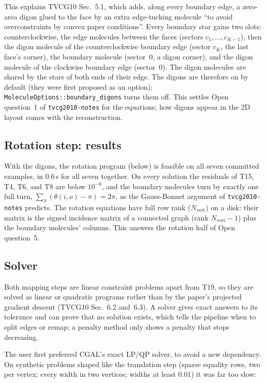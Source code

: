 \documentclass[11pt]{article}
\theoremstyle{definition}
\begin{document}
This explains TVCG10 Sec.~5.1, which adds, along every boundary edge, a
zero-area digon glued to the face by an extra edge-tucking molecule ``to avoid
overconstraints by convex paper conditions''. Every boundary star gains two
slots: counterclockwise, the edge molecules between the faces (sectors
$c_1, \dots, c_{K-1}$), then the digon molecule of the counterclockwise boundary
edge (sector $c_K$, the last face's corner), the boundary molecule (sector~0,
a digon corner), and the digon molecule of the clockwise boundary edge
(sector~0). The digon molecules are shared by the stars of both ends of their
edge. The digons are therefore on by default (they were first proposed as an
option); \texttt{MoleculeOptions::boundary\_digons} turns them off. This
settles Open question~1 of \texttt{tvcg2010-notes} for the equations; how
digons appear in the 2D layout comes with the reconstruction.

\subsection{Rotation step: results}

With the digons, the rotation program (below) is feasible on all seven
committed examples, in 0.6\,s for all seven together. On every solution the
residuals of T15, T4, T6, and T8 are below $10^{-6}$, and the boundary
molecules turn by exactly one full turn,
$\sum_{\partial}(\theta(i,o) - \pi) = 2\pi$, as the Gauss-Bonnet argument of
\texttt{tvcg2010-notes} predicts. The rotation equations have full row rank
($N_{\mathrm{vert}}$) on a disk: their matrix is the signed incidence matrix of
a connected graph (rank $N_{\mathrm{vert}} - 1$) plus the boundary molecules'
columns. This answers the rotation half of Open question~5.

\subsection{Solver}

Both mapping steps are linear constraint problems apart from T19, so they are
solved as linear or quadratic programs rather than by the paper's projected
gradient descent (TVCG10 Sec.~6.2 and~6.3). A solver gives exact answers to
its tolerance and can prove that no solution exists, which tells the pipeline
when to split edges or remap; a penalty method only shows a penalty that stops
decreasing.

The user first preferred CGAL's exact LP/QP solver, to avoid a new dependency.
On synthetic problems shaped like the translation step (sparse equality rows,
two per vertex; every width in two vertices; widths at least 0.01) it was far
too slow:
\end{document}
